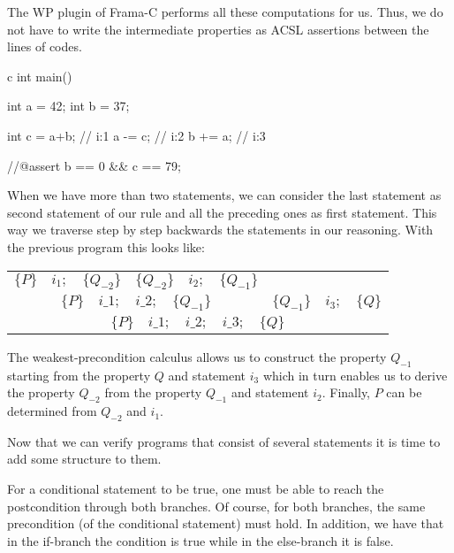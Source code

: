 The WP plugin of Frama-C performs all these computations for us. Thus,
we do not have to write the intermediate properties as ACSL assertions
between the lines of codes.



\begin{CodeBlock}{c}
int main(){
  int a = 42;
  int b = 37;

  int c = a+b; // i:1
  a -= c;      // i:2
  b += a;      // i:3

  //@assert b == 0 && c == 79;
}
\end{CodeBlock}





When we have more than two statements, we can consider the last
statement as second statement of our rule and all the preceding ones as
first statement. This way we traverse step by step backwards the
statements in our reasoning. With the previous program this looks like:


\begin{center}
\begin{tabular}{ccc}
  $\{P\}\quad i_1 ; \quad \{Q_{-2}\}$ & $\{Q_{-2}\}\quad i_2 ; \quad \{Q_{-1}\}$ & \\
  \cline{1-2}
  \multicolumn{2}{c}{$\{P\}\quad i\_1 ; \quad i\_2 ; \quad \{Q_{-1}\}$} & $\{Q_{-1}\} \quad i_3 ; \quad \{Q\}$\\
  \hline
  \multicolumn{3}{c}{$\{P\}\quad i\_1 ; \quad i\_2 ; \quad i\_3; \quad \{ Q \}$}
\end{tabular}
\end{center}

The weakest-precondition calculus allows us to construct the property
$Q_{-1}$ starting from the property $Q$ and statement $i_3$ which
in turn enables us to derive the property $Q_{-2}$ from the property
$Q_{-1}$ and statement $i_2$. Finally, $P$ can be determined from
$Q_{-2}$ and $i_1$.



Now that we can verify programs that consist of several statements it
is time to add some structure to them.





For a conditional statement to be true, one must be able to reach the
postcondition through both branches. Of course, for both branches, the
same precondition (of the conditional statement) must hold. In addition,
we have that in the if-branch the condition is true while in the
else-branch it is false.

